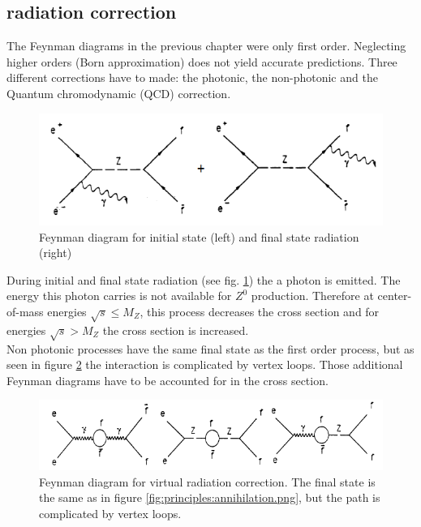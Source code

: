 \subsection{radiation correction}
\label{sec:principles:radiation correction}
The Feynman diagrams in the previous chapter were only first order. Neglecting higher orders (Born approximation) does not yield accurate predictions\cite{muenchen}. Three different corrections have to made: the photonic, the non-photonic and the Quantum chromodynamic (QCD) correction.
\begin{figure}[H]
\centering
\includegraphics{graphics/Bremsstrahlungskorrektur}
\caption[Feynman diagram: initial and final state radiation]{Feynman diagram for initial state (left) and final state radiation (right)\cite{muenchen}}
\label{fig:principles:Bremsstrahlungskorrektur}
\end{figure}
During initial and final state radiation (see fig. \ref{fig:principles:Bremsstrahlungskorrektur}) the a photon is emitted. The energy this photon carries is not available for $Z^0$ production. Therefore at center-of-mass energies $\sqrt{s}\leq M_Z$, this process decreases the cross section and	for energies $\sqrt{s} > M_Z$ the cross section is increased.\\
Non photonic processes have the same final state as the first order process, but as seen in figure \ref{fig:principles:vertexschleifen} the interaction is complicated by vertex loops. Those additional Feynman diagrams have to be accounted for in the cross section.\\
\begin{figure}[H]
	\centering
	\includegraphics[width=1.0\linewidth]{graphics/vertexschleifen}
	\caption[Feynman diagramm: virtual radiation]{Feynman diagram for virtual radiation correction. The final state is the same as in figure \ref{fig:principles:annihilation.png}, but the path is complicated by vertex loops. \cite{muenchen}}
	\label{fig:principles:vertexschleifen}
\end{figure}
